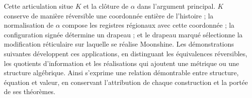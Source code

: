 Cette articulation situe $K$ et la clôture de $\alpha$ dans l'argument
principal. $K$ conserve de manière réversible une coordonnée entière de
l'histoire ; la normalisation de $\alpha$ compose les registres régionaux
avec cette coordonnée ; la configuration signée détermine un drapeau ; et
le drapeau marqué sélectionne la modification réticulaire sur laquelle se
réalise Moonshine. Les démonstrations suivantes développent ces
applications, en distinguant les équivalences réversibles, les quotients
d'information et les réalisations qui ajoutent une métrique ou une structure
algébrique. Ainsi s'exprime une relation démontrable entre structure,
équation et valeur, en conservant l'attribution de chaque construction et la
portée de ses théorèmes.




